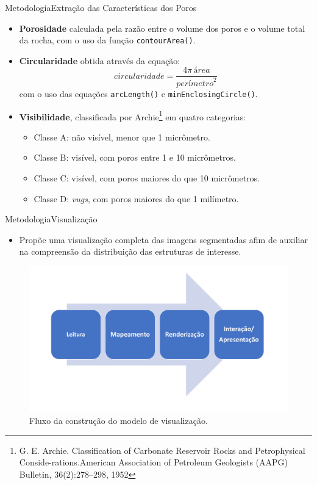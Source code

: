 \documentclass{beamer}
\begin{document}
\begin{frame}{Metodologia}{Extração das Características dos Poros}
    \begin{itemize}
         
        \item \textbf{Porosidade} calculada pela razão entre o volume dos poros e o volume total da rocha, com o uso da função \texttt{contourArea()}.
        \item \textbf{Circularidade} obtida através da equação:
        \begin{equation}
            \textit{circularidade} = \frac{4\pi \, \textit{área}}{\textit{perímetro}^{2}}
        \end{equation}
        com o uso das equações \texttt{arcLength()} e \texttt{minEnclosingCircle()}.
        \item \textbf{Visibilidade}, classificada por Archie\footnote{G. E. Archie. Classification of Carbonate Reservoir Rocks and Petrophysical Conside-rations.American Association of Petroleum Geologists (AAPG) Bulletin, 36(2):278–298, 1952} em quatro categorias:
                    
        \begin{itemize}
            \item Classe A: não visível, menor que 1 micrômetro.
            \item Classe B: visível, com poros entre 1 e 10 micrômetros.
            \item Classe C: visível, com poros maiores do que 10 micrômetros.
            \item Classe D: \textit{vugs}, com poros maiores do que 1 milímetro.
        \end{itemize}
        
    \end{itemize}
\end{frame}

\begin{frame}{Metodologia}{Visualização}
    
    \begin{itemize}
        \item Propõe uma visualização completa das imagens segmentadas afim de auxiliar na compreensão da distribuição das estruturas de interesse.
    \end{itemize}
    
    \begin{figure}[!htb]
        \centering
        \includegraphics[width=.7\textwidth]{fig/fases_vtk.pdf} \\
        \scriptsize{Fluxo da construção do modelo de visualização.}
    \end{figure}
\end{frame}
\end{document}
